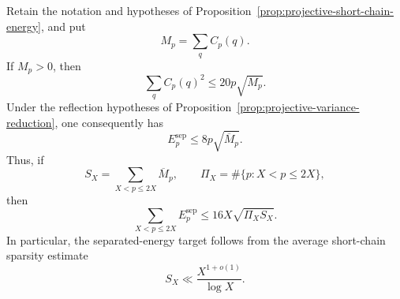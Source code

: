 \begin{proposition}
\label{prop:projective-short-chain-mass}
Retain the notation and hypotheses of
Proposition~\ref{prop:projective-short-chain-energy}, and put
\[
 M_p=\sum_q C_p(q).
\]
If $M_p>0$, then
\begin{equation}
 \sum_q C_p(q)^2\le20p\sqrt{M_p}.
\label{eq:projective-short-chain-mass}
\end{equation}
Under the reflection hypotheses of
Proposition~\ref{prop:projective-variance-reduction}, one consequently has
\begin{equation}
 E_p^{\mathrm{sep}}
 \le8p\sqrt{\overline M_p}.
\label{eq:projective-separated-mass}
\end{equation}
Thus, if
\[
 S_X=\sum_{X<p\le2X}\overline M_p,
 \qquad
 \Pi_X=\#\{p:X<p\le2X\},
\]
then
\begin{equation}
 \sum_{X<p\le2X}E_p^{\mathrm{sep}}
 \le16X\sqrt{\Pi_XS_X}.
\label{eq:projective-separated-mass-dyadic}
\end{equation}
In particular, the separated-energy target follows from the average
short-chain sparsity estimate
\begin{equation}
 S_X\ll \frac{X^{1+o(1)}}{\log X}.
\label{eq:projective-short-chain-sparsity-target}
\end{equation}
\end{proposition}

